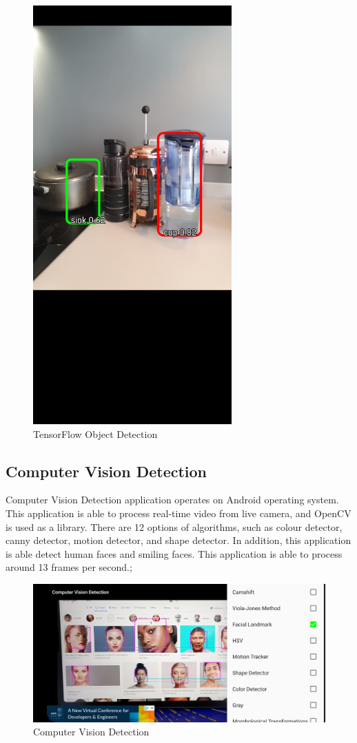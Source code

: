             \begin{figure}[!ht]
                \centering
                \includegraphics[width=3in]{images/chapter2/ml-detection-tf.jpg}
                \caption{TensorFlow Object Detection}
                \label{ts-obj-detection}
            \end{figure}

        \subsection{Computer Vision Detection}
            Computer Vision Detection application operates on Android operating system.
            This application is able to process real-time video from live camera,
            and OpenCV is used as a library.
            There are 12 options of algorithms, such as colour detector, canny detector, motion detector, and shape detector.
            In addition, this application is able detect human faces and smiling faces.
            This application is able to process around 13 frames per second.;

            \begin{figure}[!ht]
                \centering
                \includegraphics[width=5in]{images/chapter2/cv-detection.jpg}
                \caption{Computer Vision Detection}
                \label{cv-detection}
            \end{figure}
